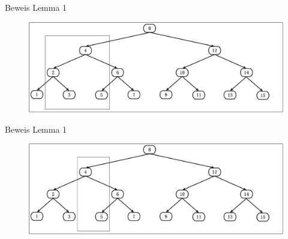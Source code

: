 \documentclass[11pt]{beamer}
\begin{document}
\begin{frame} {Beweis Lemma 1}
\begin{figure}[H]
	\centering
	\includegraphics[width=1\textwidth]{"Medien/pres/linksRechts1"}
\end{figure}
\end{frame}
\begin{frame} {Beweis Lemma 1}
	\begin{figure}[H]
		\centering
		\includegraphics[width=1\textwidth]{"Medien/pres/linksRechts2"}
	\end{figure}
\end{frame}
\end{document}
